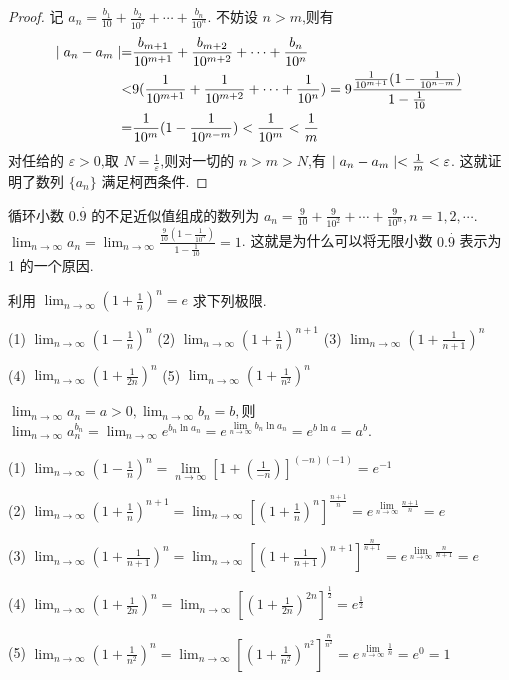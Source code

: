 \begin{proof}
    记 $a_n=\frac{b_1}{10}+\frac{b_2}{10^2}+\cdots+\frac{b_n}{10^n}$. 不妨设 $n>m$,则有
    \begin{align*}
        \mid a_n-a_m \mid=&\frac{b_{m+1}}{10^{m+1}}+\frac{b_{m+2}}{10^{m+2}}+\cdots+\frac{b_n}{10^n} \\ 
        <&9(\frac{1}{10^{m+1}}+\frac{1}{10^{m+2}}+\cdots+\frac{1}{10^n})=9\frac{\frac{1}{10^{m+1}}(1-\frac{1}{10^{n-m}})}{1-\frac{1}{10}} \\ 
        = & \frac{1}{10^m}(1-\frac{1}{10^{n-m}})<\frac{1}{10^m}<\frac{1}{m}
    \end{align*}
    对任给的 $\varepsilon>0$,取 $N=\frac{1}{\varepsilon}$,则对一切的 $n>m>N$,有 $\mid a_n-a_m \mid<\frac{1}{m}<\varepsilon$. 这就证明了数列 $\{a_n\}$ 满足柯西条件.
\end{proof}

循环小数 $0.\overset{\cdot }{9}$ 的不足近似值组成的数列为 $a_n=\frac{9}{10}+\frac{9}{10^2}+\cdots+\frac{9}{10^n},n=1,2,\cdots.$ $\lim_{n\to\infty} a_n= \lim_{n\to\infty}\frac{\frac{9}{10}(1-\frac{1}{10^n})}{1-\frac{1}{10}}=1$. 这就是为什么可以将无限小数 $0.\overset{\cdot }{9}$ 表示为 1 的一个原因.

\homework

\begin{practice}\label{prac:ee}
    利用 $\lim_{n\to\infty} (1+\frac{1}{n})^n=e$ 求下列极限.

    (1) $\lim_{n\to\infty} (1-\frac{1}{n})^n$
    \quad (2) $\lim_{n\to\infty} (1+\frac{1}{n})^{n+1}$ 
    \quad (3) $\lim_{n\to\infty} (1+\frac{1}{n+1})^n$

    (4) $\lim_{n\to\infty} (1+\frac{1}{2n})^n$
    \quad 
    (5) $\lim_{n\to\infty} (1+\frac{1}{n^2})^n$
\end{practice}

\begin{solve}
    $\lim_{n\to\infty} a_n=a>0,\lim_{n\to\infty} b_n=b,$则 $\lim_{n\to\infty} a_n^{b_n}=\lim_{n\to\infty} e^{b_n\ln a_n}=e^{\lim\limits_{n\to\infty} b_n\ln a_n}=e^{b\ln a}=a^b$.

    (1) $\lim_{n\to\infty} (1-\frac{1}{n})^n=\lim\limits_{n\to\infty} [1+(\frac{1}{-n})]^{(-n)(-1)}=e^{-1}$
    
    (2) $\lim_{n\to\infty} (1+\frac{1}{n})^{n+1}=\lim_{n\to\infty} [(1+\frac{1}{n})^{n}]^\frac{n+1}{n}=e^{\lim\limits_{n\to\infty}\frac{n+1}{n}}=e$ 
    
    (3) $\lim_{n\to\infty} (1+\frac{1}{n+1})^n=\lim_{n \to \infty} [(1+\frac{1}{n+1})^{n+1}]^{\frac{n}{n+1}}=e^{\lim\limits_{n\to\infty}\frac{n}{n+1}}=e$

    (4) $\lim_{n\to\infty} (1+\frac{1}{2n})^n=\lim_{n\to\infty} [(1+\frac{1}{2n})^{2n}]^{\frac{1}{2}}=e^{\frac{1}{2}}$
    
    (5) $\lim_{n\to\infty} (1+\frac{1}{n^2})^n=\lim_{n\to\infty} [(1+\frac{1}{n^2})^{n^2}]^{\frac{n}{n^2}}=e^{\lim\limits_{n\to\infty}\frac{1}{n}}=e^0=1$
\end{solve}


